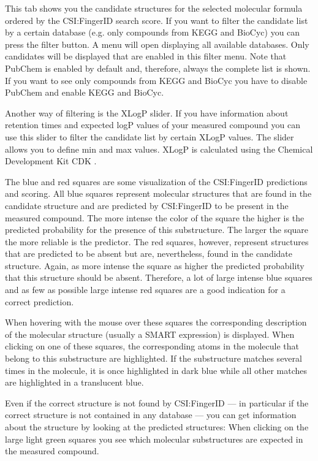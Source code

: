 \documentclass[letterpaper,10pt,openany,oneside]{sphinxmanual}
\begin{document}
This tab shows you the candidate structures for the selected molecular formula ordered by the CSI:FingerID search score. If you want to filter the candidate list by a certain database (e.g. only compounds from KEGG and BioCyc) you can press the filter button. A menu will open displaying all available databases. Only candidates will be displayed that are enabled in this filter menu. Note that PubChem is enabled by default and, therefore, always the complete list is shown. If you want to see only compounds from KEGG and BioCyc you have to disable PubChem and enable KEGG and BioCyc.

Another way of filtering is the XLogP slider. If you have information about
retention times and expected logP values of your measured compound you can
use this slider to filter the candidate list by certain XLogP values. The
slider allows you to define min and max values. XLogP is calculated using the
Chemical Development Kit CDK \citep{steinbeck03chemistry, steinbeck06recent}.

The blue and red squares are some visualization of the CSI:FingerID predictions 
and scoring. All blue squares represent molecular structures that are found in 
the candidate structure and are predicted by CSI:FingerID to be present in the 
measured compound. The more intense the color of the 
square the higher is the predicted probability for the presence of this 
substructure. The larger the square the more reliable is the predictor. 
The red squares, however, represent structures that 
are predicted to be absent but are, nevertheless, found in the candidate 
structure. Again, as more intense the square as higher the predicted 
probability 
that this structure should be absent. Therefore, a lot of large intense blue 
squares and as few as possible large intense red squares are a good indication 
for a correct prediction.

When hovering with the mouse over these squares the corresponding description of the molecular structure (usually a SMART expression) is displayed. When clicking on one of these squares, the corresponding atoms in the molecule that belong to this substructure are highlighted. If the substructure matches several times in the molecule, it is once highlighted in dark blue while all other matches are highlighted in a translucent blue.

Even if the correct structure is not found by CSI:FingerID --- in particular
if the correct structure is not contained in any database --- you can get
information about the structure by looking at the predicted structures: When
clicking on the large light green squares you see which molecular
substructures are expected in the measured compound.
\end{document}
